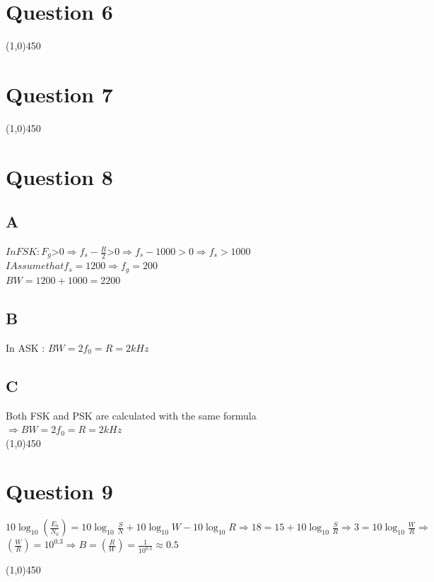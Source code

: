 \documentclass[a4paper,12pt]{book}
\begin{document}
\section {Question 6 }
\begin{doublespace}
\end{doublespace}
\line(1,0){450}


\section {Question 7 }
\begin{doublespace}
\end{doublespace}
\line(1,0){450}


\section {Question 8 }

\subsection{A}
\begin{doublespace}
$In FSK : F_g $>$  0 \Longrightarrow f_s - \frac{R}{2}  $>$  0 \Longrightarrow  f_s - 1000 > 0 \Longrightarrow f_s > 1000 $ \\
$I Assume that f_s = 1200 \Longrightarrow f_g = 200$ \\
$BW = 1200 + 1000 = 2200$\\
\end{doublespace}



\subsection{B}
In ASK : $BW = 2f_0 = R = 2 kHz$ \\


\subsection{C}
Both FSK and PSK are calculated with the same formula $\Longrightarrow BW = 2f_0 = R = 2 kHz $\\
\line(1,0){450}
\section {Question 9 }
\begin{doublespace}
$10 \log_{10}{(\frac{E_b}{N_0})} = 10 \log_{10}{\frac{S}{N}} + 10 \log_{10}{W} - 10 \log_{10}{R} \Longrightarrow 18 = 15 + 10 \log_{10}{\frac{S}{R}} \Longrightarrow 3 = 10 \log_{10}{\frac{W}{R}} \Longrightarrow$\\
$ (\frac{W}{R}) = 10^{0.3} \Longrightarrow B = (\frac{R}{W}) = \frac{1}{10^{0.3}} \approx 0.5$
\end{doublespace}
\line(1,0){450}

\end{document}
